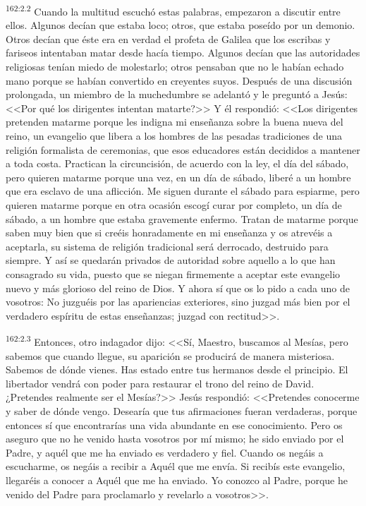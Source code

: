 \par 
\textsuperscript{162:2.2} Cuando la multitud escuchó estas palabras, empezaron a discutir entre ellos. Algunos decían que estaba loco; otros, que estaba poseído por un demonio. Otros decían que éste era en verdad el profeta de Galilea que los escribas y fariseos intentaban matar desde hacía tiempo. Algunos decían que las autoridades religiosas tenían miedo de molestarlo; otros pensaban que no le habían echado mano porque se habían convertido en creyentes suyos. Después de una discusión prolongada, un miembro de la muchedumbre se adelantó y le preguntó a Jesús: <<Por qué los dirigentes intentan matarte?>> Y él respondió: <<Los dirigentes pretenden matarme porque les indigna mi enseñanza sobre la buena nueva del reino, un evangelio que libera a los hombres de las pesadas tradiciones de una religión formalista de ceremonias, que esos educadores están decididos a mantener a toda costa. Practican la circuncisión, de acuerdo con la ley, el día del sábado, pero quieren matarme porque una vez, en un día de sábado, liberé a un hombre que era esclavo de una aflicción. Me siguen durante el sábado para espiarme, pero quieren matarme porque en otra ocasión escogí curar por completo, un día de sábado, a un hombre que estaba gravemente enfermo. Tratan de matarme porque saben muy bien que si creéis honradamente en mi enseñanza y os atrevéis a aceptarla, su sistema de religión tradicional será derrocado, destruido para siempre. Y así se quedarán privados de autoridad sobre aquello a lo que han consagrado su vida, puesto que se niegan firmemente a aceptar este evangelio nuevo y más glorioso del reino de Dios. Y ahora sí que os lo pido a cada uno de vosotros: No juzguéis por las apariencias exteriores, sino juzgad más bien por el verdadero espíritu de estas enseñanzas; juzgad con rectitud>>.

\par 
\textsuperscript{162:2.3} Entonces, otro indagador dijo: <<Sí, Maestro, buscamos al Mesías, pero sabemos que cuando llegue, su aparición se producirá de manera misteriosa. Sabemos de dónde vienes. Has estado entre tus hermanos desde el principio. El libertador vendrá con poder para restaurar el trono del reino de David. ¿Pretendes realmente ser el Mesías?>> Jesús respondió: <<Pretendes conocerme y saber de dónde vengo. Desearía que tus afirmaciones fueran verdaderas, porque entonces sí que encontrarías una vida abundante en ese conocimiento. Pero os aseguro que no he venido hasta vosotros por mí mismo; he sido enviado por el Padre, y aquél que me ha enviado es verdadero y fiel. Cuando os negáis a escucharme, os negáis a recibir a Aquél que me envía. Si recibís este evangelio, llegaréis a conocer a Aquél que me ha enviado. Yo conozco al Padre, porque he venido del Padre para proclamarlo y revelarlo a vosotros>>.

